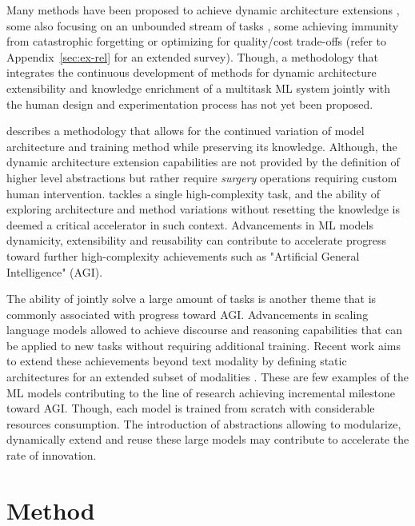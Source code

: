 \documentclass{article} \usepackage{iclr2023_conference,times}
\begin{document}
Many methods have been proposed to achieve dynamic architecture extensions \citep{Chen2016Net2NetAL,Cai2018EfficientAS}, some also focusing on an unbounded stream of tasks \citep{Yoon2018LifelongLW}, some
achieving immunity from catastrophic forgetting  \citep{Rusu2016ProgressiveNN,Rosenfeld2020IncrementalLT} or optimizing for quality/cost trade-offs \citep{Tan2019MnasNetPN} (refer to Appendix~\ref{sec:ex-rel} for an extended survey).
Though, a methodology that integrates the continuous development of methods for dynamic architecture extensibility and knowledge enrichment of a multitask ML system jointly with the human design and experimentation process has not yet been proposed.

\cite{Berner2019Dota2W} describes a methodology that allows for the continued variation of model architecture and training method while preserving its knowledge.
Although, the dynamic architecture extension capabilities are not provided by the definition of higher level abstractions but rather require \emph{surgery} operations requiring custom human intervention.
\cite{Berner2019Dota2W} tackles a single high-complexity task, and the ability of exploring architecture and method variations without resetting the knowledge is deemed a critical accelerator in such context.
Advancements in ML models dynamicity, extensibility and reusability can contribute to accelerate progress toward further high-complexity achievements such as "Artificial General Intelligence" (AGI).

The ability of jointly solve a large amount of tasks is another theme that is commonly associated with progress toward AGI.
Advancements in scaling language models \citep{Brown2020LanguageMA,Thoppilan2022LaMDALM} allowed to achieve discourse and reasoning capabilities that can be applied to new tasks without requiring additional training.
Recent work aims to extend these achievements beyond text modality by defining static architectures for an extended subset of modalities \citep{Alayrac2022FlamingoAV,Reed2022AGA}.
These are few examples of the ML models contributing to the line of research achieving incremental milestone toward AGI. Though, each model is trained from scratch with considerable resources consumption.
The introduction of abstractions allowing to modularize, dynamically extend and reuse these large models may contribute to accelerate the rate of innovation. 

\section{Method}
\label{section:method}
\end{document}
